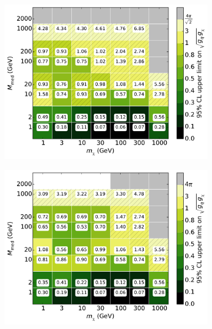\begin{figure}[h]
  \centering
    \begin{subfigure}[t]{0.495\textwidth}
      \centering
      \includegraphics[width=1.\textwidth]{figures/grid_allpoints_SAD_rat05.pdf}
      \caption{}
    \end{subfigure}
    \begin{subfigure}[t]{0.495\textwidth}
      \centering
      \includegraphics[width=1.\textwidth]{figures/grid_allpoints_SAD_rat1.pdf}
      \caption{}
    \end{subfigure}
    \begin{subfigure}[t]{0.495\textwidth}
      \centering

\end{subfigure}
\end{figure}
